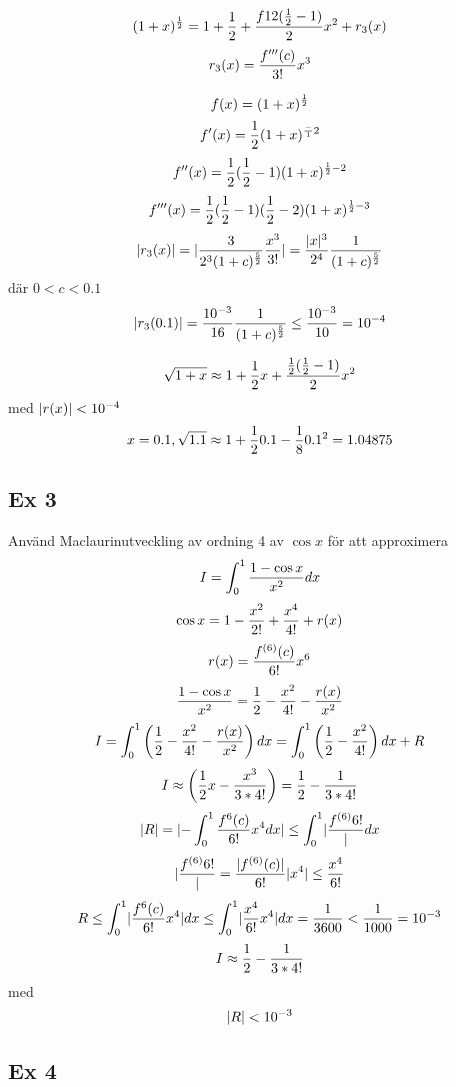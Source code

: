 \documentclass{article}
\begin{document}
$$ (1+x)^{\frac{1}{2}} = 1+\frac{1}{2} + \frac{f 12(\frac{1}{2} -1)}{2} x^2 + r_3(x) $$
$$ r_3(x) = \frac{f'''(c)}{3!}x^3 $$

$$ f(x)= (1+x)^{\frac{1}{2}} $$
$$ f'(x)= \frac{1}{2}(1+x)^{\frac{-}{1}2} $$
$$ f''(x)= \frac{1}{2} (\frac{1}{2} - 1)(1+x)^{\frac{1}{2} - 2} $$
$$ f'''(x)= \frac{1}{2} (\frac{1}{2} - 1)(\frac{1}{2} - 2)(1+x)^{\frac{1}{2} - 3} $$
$$ \lvert r_3(x)\rvert = \lvert \frac{3}{2^3(1+c)^{\frac{5}{2}}} \frac{x^3}{3!} \rvert = \frac{\lvert x\rvert^3}{2^4}\frac{1}{(1+c)^{\frac{5}{2}}} $$
där $ 0<c<0.1$
$$ \lvert r_3(0.1)\rvert = \frac{10^{-3}}{16} \frac{1}{(1+c)^{\frac{5}{2}}} \le \frac{10^{-3}}{10} = 10^{-4} $$

$$ \sqrt{1+x} \approx 1+\frac{1}{2} x + \frac{\frac{1}{2}(\frac{1}{2} - 1)}{2}x^2 $$
med $\lvert r(x)\rvert < 10^{-4}$
$$ x=0.1, \sqrt{1.1} \approx 1+\frac{1}{2}0.1 - \frac{1}{8} 0.1^2 = 1.04875  $$

\subsection{Ex 3}
Använd Maclaurinutveckling av ordning 4 av $\cos x$ för att approximera
$$ I = \int^1_0{ \frac{1-\cos x}{x^2} dx } $$
$$ \cos x = 1 - \frac{x^2}{2!} + \frac{x^4}{4!} + r(x) $$
$$ r(x) = \frac{f^{(6)}(c)}{6!}x^6 $$
$$ \frac{1-\cos x}{x^2} = \frac{1}{2} - \frac{x^2}{4!}-\frac{r(x)}{x^2} $$
$$ I = \int^1_0\left(\frac{1}{2} - \frac{x^2}{4!} - \frac{r(x)}{x^2}\right) dx = \int^1_0\left(\frac{1}{2} - \frac{x^2}{4!}\right) dx + R $$
$$ I \approx \left(\frac{1}{2} x - \frac{x^3}{3*4!}\right) = \frac{1}{2} - \frac{1}{3*4!} $$
$$ \lvert R\rvert = \lvert-\int^1_0\frac{f^{6}(c)}{6!}x^4dx\rvert \le \int^1_0\lvert\frac{f^{(6)}{6!}}{\rvert} dx$$
$$ \lvert\frac{f^{(6)}{6!}}{\rvert} = \frac{\lvert f^{(6)}(c)\rvert}{6!}\lvert x^4\rvert \le \frac{x^4}{6!}$$
$$ R \le \int^1_0\lvert\frac{f^{6}(c)}{6!}x^4\rvert dx \le  \int^1_0\lvert\frac{x^4}{6!}x^4\rvert dx = \frac{1}{3600} < \frac{1}{1000} = 10^{-3} $$
$$ I \approx \frac{1}{2} - \frac{1}{3*4!} $$
med
$$ \lvert R\rvert < 10^{-3} $$

\subsection{Ex 4}

$$  $$
$$  $$
$$  $$
\end{document}
